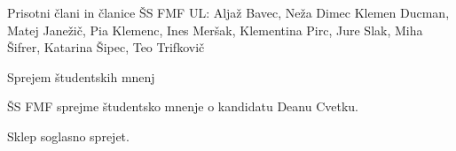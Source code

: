 \documentclass{seja}
\begin{document}
Prisotni člani in članice ŠS FMF UL:
Aljaž Bavec,
Neža Dimec
Klemen Ducman,
Matej Janežič,
Pia Klemenc,
Ines Meršak,
Klementina Pirc,
Jure Slak,
Miha Šifrer,
Katarina Šipec,
Teo Trifkovič

\begin{red*}
  \item Sprejem študentskih mnenj
\end{red*}

\begin{ad}
	\item 
	\begin{sklep}
		ŠS FMF sprejme študentsko mnenje o kandidatu Deanu Cvetku.
	\end{sklep}
	Sklep soglasno sprejet. 
\end{ad}

\makeatletter \global\let\@enddocumenthook\@empty \makeatother
{}
\end{document}
